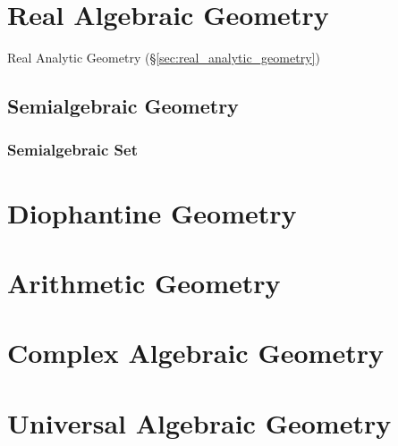 \section{Real Algebraic Geometry}\label{sec:real_algebraic_geometry}

Real Analytic Geometry (\S\ref{sec:real_analytic_geometry})



\subsection{Semialgebraic Geometry}\label{sec:semialgebraic_geometry}

\subsubsection{Semialgebraic Set}\label{sec:semialgebraic_set}



\section{Diophantine Geometry}\label{sec:diophantine_geometry}

\section{Arithmetic Geometry}\label{sec:arithmetic_geometry}

\section{Complex Algebraic Geometry}
\label{sec:complex_algebraic_geometry}

\section{Universal Algebraic Geometry}\label{sec:universal_geometry}

